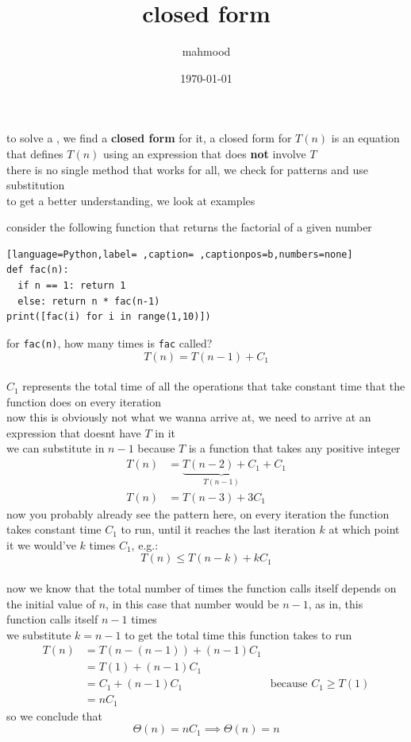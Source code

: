 \documentclass[a4paper,12pt]{article}
\author{mahmood}
\date{\today}
\title{closed form}
\begin{document}
\maketitle
to solve a , we find a \textbf{closed form} for it, a closed form for \(T(n)\) is an equation that defines \(T(n)\) using an expression that does \textbf{not} involve \(T\)\\[0pt]
there is no single method that works for all, we check for patterns and use substitution\\[0pt]
to get a better understanding, we look at examples\\[0pt]
\begin{my_example}
consider the following function that returns the factorial of a given number\\[0pt]
\begin{lstlisting}[language=Python,label= ,caption= ,captionpos=b,numbers=none]
def fac(n):
  if n == 1: return 1
  else: return n * fac(n-1)
print([fac(i) for i in range(1,10)])
\end{lstlisting}
for \texttt{fac(n)}, how many times is \texttt{fac} called?\\[0pt]
\[ T(n) = T(n-1) + C_1 \]\\[0pt]
\(C_1\) represents the total time of all the operations that take constant time that the function does on every iteration\\[0pt]
now this is obviously not what we wanna arrive at, we need to arrive at an expression that doesnt have \(T\) in it\\[0pt]
we can substitute in \(n - 1\) because \(T\) is a function that takes any positive integer\\[0pt]
\begin{align*}
  T(n) &= \underbrace{T(n-2) + C_1}_{T(n-1)} + C_1\\
  T(n) &= T(n-3) + 3C_1
\end{align*}
now you probably already see the pattern here, on every iteration the function takes constant time \(C_1\) to run, until it reaches the last iteration \(k\) at which point it we would've \(k\) times \(C_1\), e.g.:\\[0pt]
\[ T(n) \leq T(n-k) + kC_1 \]\\[0pt]

now we know that the total number of times the function calls itself depends on the initial value of \(n\), in this case that number would be \(n - 1\), as in, this function calls itself \(n - 1\) times\\[0pt]
we substitute \(k = n - 1\) to get the total time this function takes to run\\[0pt]
\begin{align*}
 T(n) &= T(n-(n-1)) + (n-1)C_1\\
      &= T(1) + (n-1)C_1\\
      &= C_1 + (n-1)C_1 &\text{because } C_1 \geq T(1)\\
      &= nC_1
\end{align*}
so we conclude that\\[0pt]
\[
  \Theta(n) = nC_1 \implies \Theta(n) = n
\]\\[0pt]
\end{my_example}
\end{document}

